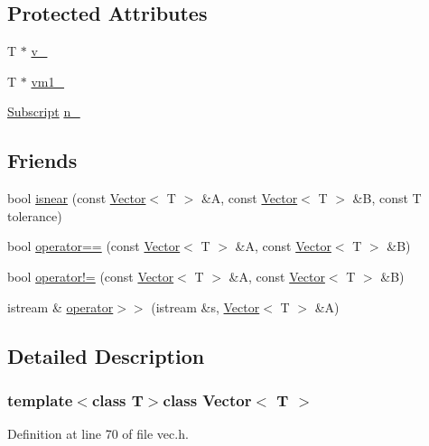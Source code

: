 \subsection*{Protected Attributes}
\begin{DoxyCompactItemize}
\item 
T $\ast$ \hyperlink{class_vector_a35e75689eb9e46f564a5eaf515c73b72}{v\+\_\+}
\item 
T $\ast$ \hyperlink{class_vector_a5fe8f82950fdae7d3a8f2405e66bbbbc}{vm1\+\_\+}
\item 
\hyperlink{vec_8h_a2dedc729e88b5f13d52bc9aeeda264dc}{Subscript} \hyperlink{class_vector_a163c6b74af740a53f7cddc72c4d32978}{n\+\_\+}
\end{DoxyCompactItemize}
\subsection*{Friends}
\begin{DoxyCompactItemize}
\item 
bool \hyperlink{class_vector_a463b93549af3a1b5106e42b9e26cc7a1}{isnear} (const \hyperlink{class_vector}{Vector}$<$ T $>$ \&A, const \hyperlink{class_vector}{Vector}$<$ T $>$ \&B, const T tolerance)
\item 
bool \hyperlink{class_vector_ae8a7164cace28ff215b1d2b9d0e8a092}{operator==} (const \hyperlink{class_vector}{Vector}$<$ T $>$ \&A, const \hyperlink{class_vector}{Vector}$<$ T $>$ \&B)
\item 
bool \hyperlink{class_vector_ac833e0191dee06fa44ac6b49877336dc}{operator!=} (const \hyperlink{class_vector}{Vector}$<$ T $>$ \&A, const \hyperlink{class_vector}{Vector}$<$ T $>$ \&B)
\item 
istream \& \hyperlink{class_vector_a05030005479a3bd6c80f279f60e04568}{operator$>$$>$} (istream \&s, \hyperlink{class_vector}{Vector}$<$ T $>$ \&A)
\end{DoxyCompactItemize}


\subsection{Detailed Description}
\subsubsection*{template$<$class T$>$class Vector$<$ T $>$}



Definition at line 70 of file vec.\+h.



